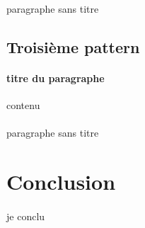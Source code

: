 \documentclass[a4paper]{article}
\begin{document}
		\paragraph{}{paragraphe sans titre}
		
		\subsection{Troisième pattern}
		\paragraph{titre du paragraphe}{contenu}
		\paragraph{}{paragraphe sans titre}
	
	
	\section*{Conclusion}
		\paragraph{}{je conclu}
		
\end{document}
